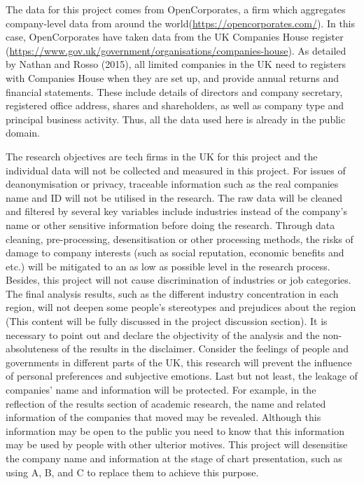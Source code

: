 \documentclass[
  12pt,
  oneside]{book}
\begin{document}
The data for this project comes from OpenCorporates, a firm which aggregates company-level data from around the world(\url{https://opencorporates.com/}). In this case, OpenCorporates have taken data from the UK Companies House register (\url{https://www.gov.uk/government/organisations/companies-house}). As detailed by Nathan and Rosso (2015), all limited companies in the UK need to registers with Companies House when they are set up, and provide annual returns and financial statements. These include details of directors and company secretary, registered office address, shares and shareholders, as well as company type and principal business activity. Thus, all the data used here is already in the public domain.

The research objectives are tech firms in the UK for this project and the individual data will not be collected and measured in this project. For issues of deanonymisation or privacy, traceable information such as the real companies name and ID will not be utilised in the research. The raw data will be cleaned and filtered by several key variables include industries instead of the company's name or other sensitive information before doing the research. Through data cleaning, pre-processing, desensitisation or other processing methods, the risks of damage to company interests (such as social reputation, economic benefits and etc.) will be mitigated to an as low as possible level in the research process. Besides, this project will not cause discrimination of industries or job categories. The final analysis results, such as the different industry concentration in each region, will not deepen some people's stereotypes and prejudices about the region (This content will be fully discussed in the project discussion section). It is necessary to point out and declare the objectivity of the analysis and the non-absoluteness of the results in the disclaimer. Consider the feelings of people and governments in different parts of the UK, this research will prevent the influence of personal preferences and subjective emotions. Last but not least, the leakage of companies' name and information will be protected. For example, in the reflection of the results section of academic research, the name and related information of the companies that moved may be revealed. Although this information may be open to the public you need to know that this information may be used by people with other ulterior motives. This project will desensitise the company name and information at the stage of chart presentation, such as using A, B, and C to replace them to achieve this purpose.
\end{document}
